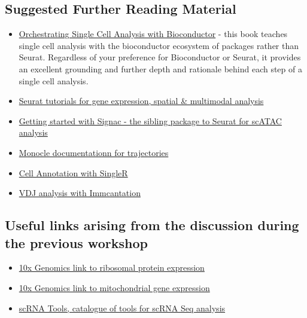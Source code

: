 \documentclass[
]{book}
\providecommand{\tightlist}{%
  \setlength{\itemsep}{0pt}\setlength{\parskip}{0pt}}
\begin{document}
\subsection{Suggested Further Reading Material}\label{suggested-further-reading-material}

\begin{itemize}
\tightlist
\item
  \href{https://bioconductor.org/books/release/OSCA/}{Orchestrating Single Cell Analysis with Bioconductor} - this book teaches single cell analysis with the bioconductor ecosystem of packages rather than Seurat. Regardless of your preference for Bioconductor or Seurat, it provides an excellent grounding and further depth and rationale behind each step of a single cell analysis.
\item
  \href{https://satijalab.org/seurat/articles/get_started.html}{Seurat tutorials for gene expression, spatial \& multimodal analysis}
\item
  \href{https://satijalab.org/signac/articles/overview.html}{Getting started with Signac - the sibling package to Seurat for scATAC analysis}
\item
  \href{https://cole-trapnell-lab.github.io/monocle3/docs/trajectories/}{Monocle documentationn for trajectories}
\item
  \href{http://bioconductor.org/books/devel/SingleRBook/}{Cell Annotation with SingleR}
\item
  \href{https://immcantation.readthedocs.io/en/stable/}{VDJ analysis with Immcantation}
\end{itemize}

\subsection{Useful links arising from the discussion during the previous workshop}\label{useful-links-arising-from-the-discussion-during-the-previous-workshop}

\begin{itemize}
\tightlist
\item
  \href{https://kb.10xgenomics.com/hc/en-us/articles/218169723-What-fraction-of-reads-map-to-ribosomal-proteins-}{10x Genomics link to ribosomal protein expression}
\item
  \href{https://kb.10xgenomics.com/hc/en-us/articles/360001086611-Why-do-I-see-a-high-level-of-mitochondrial-gene-expression-}{10x Genomics link to mitochondrial gene expression}
\item
  \href{https://www.scrna-tools.org/}{scRNA Tools, catalogue of tools for scRNA Seq analysis}
\end{itemize}
\end{document}
